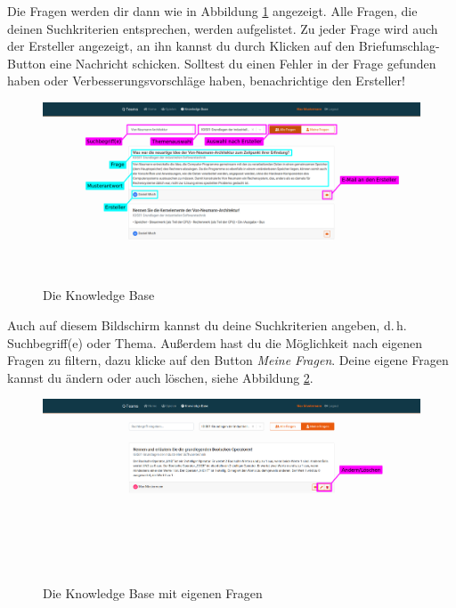 \documentclass[a4paper,11pt,listof=numbered,glossary=totoc,parskip=half,toc=bib]{scrreprt}
\newcommand{\dash}{\mbox{d.\,h.}\xspace}
\begin{document}
\begin{appendices}
	Die Fragen werden dir dann wie in Abbildung \ref{fig:guide_kb} angezeigt. Alle Fragen, die deinen Suchkriterien entsprechen, werden aufgelistet. Zu jeder Frage wird auch der Ersteller angezeigt, an ihn kannst du durch Klicken auf den Briefumschlag-Button eine Nachricht schicken. Solltest du einen Fehler in der Frage gefunden haben oder Verbesserungsvorschläge haben, benachrichtige den Ersteller!
	
	\begin{figure}[h!]
		\centering
		\includegraphics[width=\textwidth]{UserGuide/Knowledge_Base.png}
		\caption{Die Knowledge Base}
		\label{fig:guide_kb}
	\end{figure}	
	
	Auch auf diesem Bildschirm kannst du deine Suchkriterien angeben, \dash Suchbegriff(e) oder Thema. Außerdem hast du die Möglichkeit nach eigenen Fragen zu filtern, dazu klicke auf den Button \textit{Meine Fragen}. Deine eigene Fragen kannst du ändern oder auch löschen, siehe Abbildung \ref{fig:guide_kb_eigene}.
		
	\begin{figure}[h!]
		\centering
		\includegraphics[width=\textwidth]{UserGuide/Knowledge_Base_eigene.png}
		\caption{Die Knowledge Base mit eigenen Fragen}
		\label{fig:guide_kb_eigene}
	\end{figure}	
			

\end{appendices}
\end{document}
